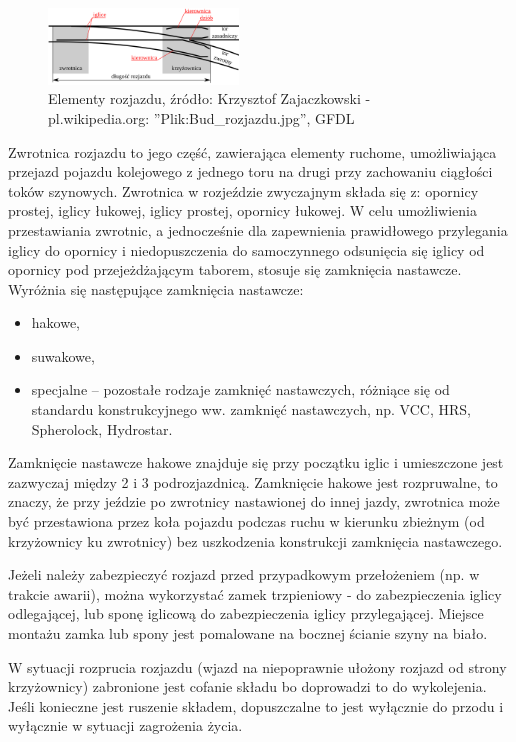 \begin{figure}
	\includegraphics[width=0.45\textwidth]{skryptkierownik-img/rozjazd.png}
	\caption{Elementy rozjazdu, źródło: Krzysztof Zajaczkowski - pl.wikipedia.org: ''Plik:Bud\_rozjazdu.jpg'', GFDL}
	\label{fig:rozjazd}
\end{figure}
Zwrotnica rozjazdu to jego część, zawierająca elementy ruchome, umożliwiająca przejazd pojazdu
kolejowego z jednego toru na drugi przy zachowaniu ciągłości toków szynowych.
Zwrotnica w rozjeździe zwyczajnym składa się z: opornicy prostej, iglicy łukowej, iglicy prostej, opornicy łukowej.
W celu umożliwienia przestawiania zwrotnic, a jednocześnie dla zapewnienia prawidłowego
przylegania iglicy do opornicy i niedopuszczenia do samoczynnego odsunięcia się iglicy od opornicy
pod przejeżdżającym taborem, stosuje się zamknięcia nastawcze.
Wyróżnia się następujące zamknięcia nastawcze:
\begin{itemize}
	\item hakowe,
	\item suwakowe,
	\item specjalne – pozostałe rodzaje zamknięć nastawczych, różniące się od standardu
	konstrukcyjnego ww. zamknięć nastawczych, np. VCC, HRS, Spherolock, Hydrostar.
\end{itemize}

Zamknięcie nastawcze hakowe znajduje się przy początku iglic i umieszczone jest zazwyczaj między 2 i 3 podrozjazdnicą.
Zamknięcie hakowe jest rozpruwalne, to znaczy, że przy jeździe po zwrotnicy nastawionej do innej jazdy, zwrotnica może być przestawiona przez koła pojazdu podczas ruchu w kierunku zbieżnym (od krzyżownicy ku zwrotnicy) bez uszkodzenia konstrukcji zamknięcia nastawczego.

Jeżeli należy zabezpieczyć rozjazd przed przypadkowym przełożeniem (np. w trakcie awarii), można wykorzystać zamek trzpieniowy - do zabezpieczenia iglicy odlegającej, lub sponę iglicową do zabezpieczenia iglicy przylegającej. Miejsce montażu zamka lub spony jest pomalowane na bocznej ścianie szyny na biało.

W sytuacji rozprucia rozjazdu (wjazd na niepoprawnie ułożony rozjazd od strony krzyżownicy) zabronione jest cofanie składu bo doprowadzi to do wykolejenia. Jeśli konieczne jest ruszenie składem, dopuszczalne to jest wyłącznie do przodu i wyłącznie w sytuacji zagrożenia życia.

